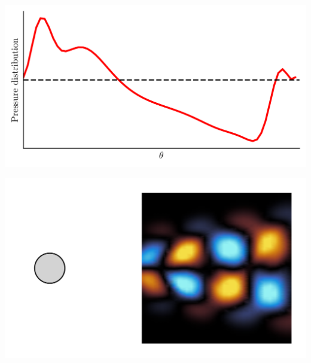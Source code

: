 \documentclass[aspectratio=169, usenames, dvipsnames]{beamer}
\begin{document}
{\begin{frame}
  \begin{minipage}{.48\textwidth}
    \includegraphics[width=\textwidth]{pressure_distribution_cca_4}
  \end{minipage}%
  \hfill
  \begin{minipage}{.48\textwidth}
    \includegraphics[width=\textwidth]{vorticity_distribution_cca_4}
  \end{minipage}
  
  \vfill
\end{frame}

\begin{frame}
  \vfill
  \centering


\end{frame}}
\end{document}
